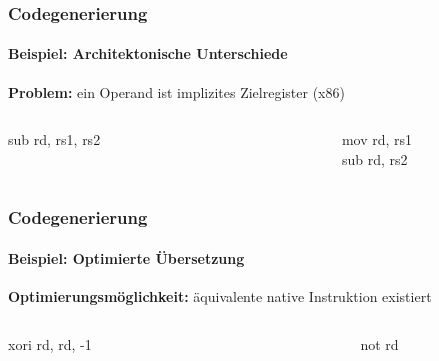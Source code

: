 \begin{frame}
	\frametitle{Codegenerierung}
	\framesubtitle{Beispiel: Architektonische Unterschiede}
	
	\textbf{Problem:} ein Operand ist implizites Zielregister (x86)
	
	\vspace{2cm}
	
	\begin{columns}[onlytextwidth]
		\ttfamily
		\begin{column}{0.45\textwidth}
			\centering
			sub rd, rs1, rs2
		\end{column}
		
		\begin{column}{0.05\textwidth}
			\centering
			\conclude
		\end{column}
		
		\begin{column}{0.45\textwidth}
			\centering
			mov rd, rs1\\
			sub rd, rs2
		\end{column}
	\end{columns}
\end{frame}


\begin{frame}
	\frametitle{Codegenerierung}
	\framesubtitle{Beispiel: Optimierte Übersetzung}
	
	\textbf{Optimierungsmöglichkeit:} äquivalente native Instruktion existiert
	
	\vspace{2cm}
	
	\begin{columns}[onlytextwidth]
		\ttfamily
		\begin{column}{0.45\textwidth}
			\centering
			xori rd, rd, -1
		\end{column}
		
		\begin{column}{0.05\textwidth}
			\centering
			\conclude
		\end{column}
		
		\begin{column}{0.45\textwidth}
			\centering
			not rd
		\end{column}
	\end{columns}
\end{frame}


